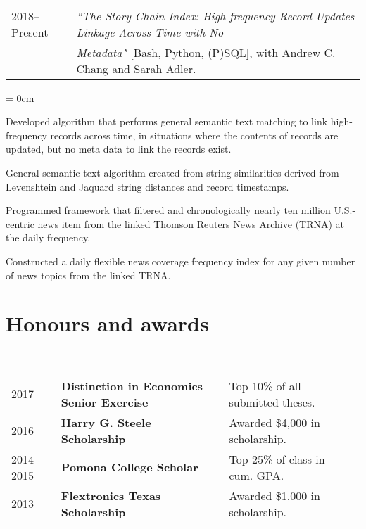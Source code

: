 \documentclass[a4paper, 11pt]{article}
\begin{document}
    \vspace*{1em}

    ~\begin{tabular}{lP{15cm}}
      2018--Present & \textit{``The Story Chain Index: High-frequency Record Updates Linkage Across Time with No}\\
      & \textit{Metadata"} {[Bash, Python, (P)SQL]}, with Andrew C. Chang and Sarah Adler.
    \end{tabular}

    \begin{compactitem}\parskip = 0cm
      \item Developed algorithm that performs general semantic text matching to link high-frequency records across time, in situations where the contents of records are updated, but no meta data to link the records exist.
      \item General semantic text algorithm created from string similarities derived from Levenshtein and Jaquard string distances and record timestamps.
      \item Programmed framework that filtered and chronologically nearly ten million U.S.-centric news item from the linked Thomson Reuters News Archive (TRNA) at the daily frequency.
      \item Constructed a daily flexible news coverage frequency index for any given number of news topics from the linked TRNA.
    \end{compactitem}

  \section{Honours and awards}
    ~\begin{tabular}{lllP{1cm}}
      2017 & \textbf{Distinction in Economics Senior Exercise} & Top 10\% of all submitted theses.\\
      2016 & \textbf{Harry G. Steele Scholarship} & Awarded \$4,000 in scholarship.\\
      2014-2015 & \textbf{Pomona College Scholar} & Top 25\% of class in cum. GPA.\\
      2013 & \textbf{Flextronics Texas Scholarship} & Awarded \$1,000 in scholarship.
    \end{tabular}
\end{document}
